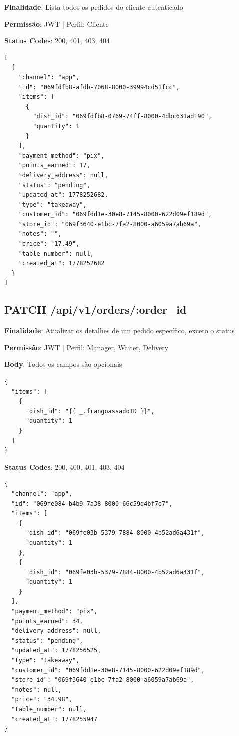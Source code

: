 \noindent\textbf{Finalidade}: Lista todos os pedidos do cliente autenticado

\noindent\textbf{Permissão}: JWT | Perfil: Cliente

\noindent\textbf{Status Codes}: 200, 401, 403, 404

\begin{tcolorbox}[colback=green!5, colframe=black, title=\textbf{200 OK}]
\begin{verbatim}
[
  {
    "channel": "app",
    "id": "069fdfb8-afdb-7068-8000-39994cd51fcc",
    "items": [
      {
        "dish_id": "069fdfb8-0769-74ff-8000-4dbc631ad190",
        "quantity": 1
      }
    ],
    "payment_method": "pix",
    "points_earned": 17,
    "delivery_address": null,
    "status": "pending",
    "updated_at": 1778252682,
    "type": "takeaway",
    "customer_id": "069fdd1e-30e8-7145-8000-622d09ef189d",
    "store_id": "069f3640-e1bc-7fa2-8000-a6059a7ab69a",
    "notes": "",
    "price": "17.49",
    "table_number": null,
    "created_at": 1778252682
  }
]
\end{verbatim}
\end{tcolorbox}

\subsection{PATCH /api/v1/orders/:order\_id}

\noindent\textbf{Finalidade}: Atualizar os detalhes de um pedido específico, exceto o status

\noindent\textbf{Permissão}: JWT | Perfil: Manager, Waiter, Delivery

\noindent\textbf{Body}: Todos os campos são opcionais

\begin{verbatim}
{
  "items": [
    {
      "dish_id": "{{ _.frangoassadoID }}",
      "quantity": 1
    }
  ]
}
\end{verbatim}

\noindent\textbf{Status Codes}: 200, 400, 401, 403, 404

\begin{tcolorbox}[colback=green!5, colframe=black, title=\textbf{200 OK}]
\begin{verbatim}
{
  "channel": "app",
  "id": "069fe084-b4b9-7a38-8000-66c59d4bf7e7",
  "items": [
    {
      "dish_id": "069fe03b-5379-7884-8000-4b52ad6a431f",
      "quantity": 1
    },
    {
      "dish_id": "069fe03b-5379-7884-8000-4b52ad6a431f",
      "quantity": 1
    }
  ],
  "payment_method": "pix",
  "points_earned": 34,
  "delivery_address": null,
  "status": "pending",
  "updated_at": 1778256525,
  "type": "takeaway",
  "customer_id": "069fdd1e-30e8-7145-8000-622d09ef189d",
  "store_id": "069f3640-e1bc-7fa2-8000-a6059a7ab69a",
  "notes": null,
  "price": "34.98",
  "table_number": null,
  "created_at": 1778255947
}
\end{verbatim}
\end{tcolorbox}

